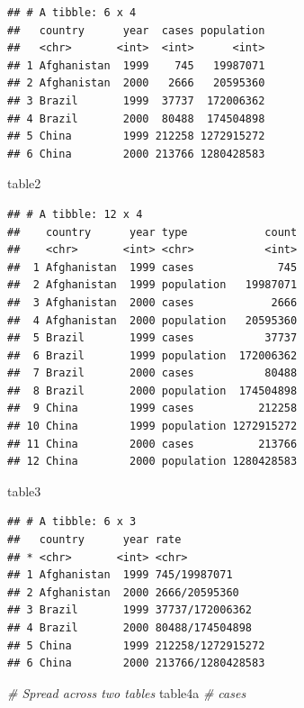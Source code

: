 \documentclass[
]{book}
\newenvironment{Shaded}{\begin{snugshade}}{\end{snugshade}}
\newcommand{\CommentTok}[1]{\textcolor[rgb]{0.56,0.35,0.01}{\textit{#1}}}
\newcommand{\NormalTok}[1]{#1}
\begin{document}
\begin{verbatim}
## # A tibble: 6 x 4
##   country      year  cases population
##   <chr>       <int>  <int>      <int>
## 1 Afghanistan  1999    745   19987071
## 2 Afghanistan  2000   2666   20595360
## 3 Brazil       1999  37737  172006362
## 4 Brazil       2000  80488  174504898
## 5 China        1999 212258 1272915272
## 6 China        2000 213766 1280428583
\end{verbatim}

\begin{Shaded}
\begin{Highlighting}[]
\NormalTok{table2}
\end{Highlighting}
\end{Shaded}

\begin{verbatim}
## # A tibble: 12 x 4
##    country      year type            count
##    <chr>       <int> <chr>           <int>
##  1 Afghanistan  1999 cases             745
##  2 Afghanistan  1999 population   19987071
##  3 Afghanistan  2000 cases            2666
##  4 Afghanistan  2000 population   20595360
##  5 Brazil       1999 cases           37737
##  6 Brazil       1999 population  172006362
##  7 Brazil       2000 cases           80488
##  8 Brazil       2000 population  174504898
##  9 China        1999 cases          212258
## 10 China        1999 population 1272915272
## 11 China        2000 cases          213766
## 12 China        2000 population 1280428583
\end{verbatim}

\begin{Shaded}
\begin{Highlighting}[]
\NormalTok{table3}
\end{Highlighting}
\end{Shaded}

\begin{verbatim}
## # A tibble: 6 x 3
##   country      year rate             
## * <chr>       <int> <chr>            
## 1 Afghanistan  1999 745/19987071     
## 2 Afghanistan  2000 2666/20595360    
## 3 Brazil       1999 37737/172006362  
## 4 Brazil       2000 80488/174504898  
## 5 China        1999 212258/1272915272
## 6 China        2000 213766/1280428583
\end{verbatim}

\begin{Shaded}
\begin{Highlighting}[]
\CommentTok{# Spread across two tables}
\NormalTok{table4a  }\CommentTok{# cases}
\end{Highlighting}
\end{Shaded}
\end{document}
